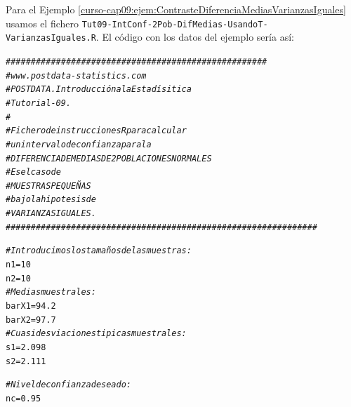 \documentclass[10pt,a4paper]{article}\usepackage[]{graphicx}\usepackage[]{color}
\makeatletter
\newcommand{\hlnum}[1]{\textcolor[rgb]{0.686,0.059,0.569}{#1}}%
\newcommand{\hlcom}[1]{\textcolor[rgb]{0.678,0.584,0.686}{\textit{#1}}}%
\newcommand{\hlstd}[1]{\textcolor[rgb]{0.345,0.345,0.345}{#1}}%
\newcommand{\hlkwb}[1]{\textcolor[rgb]{0.69,0.353,0.396}{#1}}%
\newenvironment{kframe}{%
 \def\at@end@of@kframe{}%
 \ifinner\ifhmode%
  \def\at@end@of@kframe{\end{minipage}}%
  \begin{minipage}{\columnwidth}%
 \fi\fi%
 \def\FrameCommand##1{\hskip\@totalleftmargin \hskip-\fboxsep
 \colorbox{shadecolor}{##1}\hskip-\fboxsep
     \hskip-\linewidth \hskip-\@totalleftmargin \hskip\columnwidth}%
 \MakeFramed {\advance\hsize-\width
   \@totalleftmargin\z@ \linewidth\hsize
   \@setminipage}}%
 {\par\unskip\endMakeFramed%
 \at@end@of@kframe}
\newenvironment{knitrout}{}{} %
\makeatother
\begin{document}
Para el Ejemplo \ref{curso-cap09:ejem:ContrasteDiferenciaMediasVarianzasIguales} usamos el fichero {\tt Tut09-IntConf-2Pob-DifMedias-UsandoT-VarianzasIguales.R}. El código con los datos del ejemplo sería así:

\begin{knitrout}
\color{fgcolor}\begin{kframe}
\begin{alltt}
\hlcom{####################################################}
\hlcom{# www.postdata-statistics.com}
\hlcom{# POSTDATA. Introducción a la Estadísitica}
\hlcom{# Tutorial-09.}
\hlcom{#}
\hlcom{# Fichero de instrucciones R para calcular}
\hlcom{# un intervalo de confianza para la}
\hlcom{# DIFERENCIA DE MEDIAS DE 2 POBLACIONES NORMALES}
\hlcom{# Es el caso de}
\hlcom{# MUESTRAS PEQUEÑAS}
\hlcom{# bajo la hipotesis de}
\hlcom{# VARIANZAS IGUALES.}
\hlcom{##############################################################}

\hlcom{# Introducimos los tamaños de las muestras:}
\hlstd{n1} \hlkwb{=} \hlnum{10}
\hlstd{n2} \hlkwb{=} \hlnum{10}
\hlcom{# Medias muestrales:}
\hlstd{barX1} \hlkwb{=} \hlnum{94.2}
\hlstd{barX2} \hlkwb{=} \hlnum{97.7}
\hlcom{# Cuasidesviaciones tipicas muestrales:}
\hlstd{s1} \hlkwb{=} \hlnum{2.098}
\hlstd{s2} \hlkwb{=} \hlnum{2.111}

\hlcom{# Nivel de confianza deseado:}
\hlstd{nc} \hlkwb{=} \hlnum{0.95}


\end{alltt}
\end{kframe}
\end{knitrout}
\end{document}
